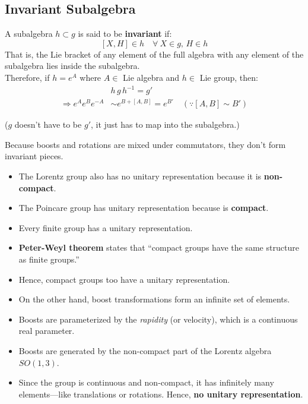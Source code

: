 \documentclass[14pt]{article} %
\begin{document}
\subsection*{Invariant Subalgebra}
A subalgebra $h \subset g$ is said to be \textbf{invariant} if:
\[
[X,H] \in h \quad \forall~ X \in g, \, H \in h
\]
That is, the Lie bracket of any element of the full algebra with any element of the subalgebra lies inside the subalgebra.\\
Therefore, if $h = e^A$ where $A \in$ Lie algebra and $h \in$ Lie group, then:
\begin{align*}
&h\,g\,h^{-1} = g' \\
\Rightarrow e^A e^B e^{-A} &\sim e^{B+[A,B]} = e^{B'} \quad (\because [A,B] \sim B' )
\end{align*}
\begin{center}
    ($g$ doesn’t have to be $g'$, it just has to map into the subalgebra.)
\end{center}
Because boosts and rotations are mixed under commutators, they don’t form invariant pieces.
\begin{tcolorbox}[ title=Notes]
\begin{itemize}
    \item The Lorentz group also has no unitary representation because it is \textbf{non-compact}.
    \item The Poincare group has unitary representation because is \textbf{compact}.
    \item Every finite group has a unitary representation.
    \item \textbf{Peter-Weyl theorem} states that “compact groups have the same structure as finite groups.”
    \item Hence, compact groups too have a unitary representation.
    \item On the other hand, boost transformations form an infinite set of elements.
    \item Boosts are parameterized by the \textit{rapidity} (or velocity), which is a continuous real parameter.
    \item Boosts are generated by the non-compact part of the Lorentz algebra $SO(1,3)$.
    \item Since the group is continuous and non-compact, it has infinitely many elements—like translations or rotations. Hence, \textbf{no unitary representation}.
\end{itemize}
\end{tcolorbox}
\end{document}
